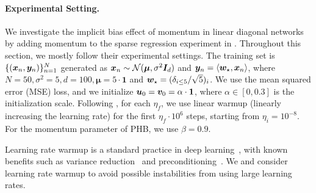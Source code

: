 \paragraph{Experimental Setting.}
We investigate the implicit bias effect of momentum in linear diagonal networks by adding momentum to the sparse regression experiment in \citet{nacson2022stepsize}.
Throughout this section, we mostly follow their experimental settings.
The training set is $\{({\bm{x}}_n, {\bm{y}}_n)\}_{n=1}^N$ generated as ${\bm{x}}_n \sim {\mathcal{N}}(\bm\mu, \sigma^2 {\bm{I}}_d)$ and ${\bm{y}}_n = \langle {\bm{w}}_\star, {\bm{x}}_n \rangle$, where $N = 50, \sigma^2 = 5, d = 100, \bm\mu = 5\cdot\bm{1}$ and ${\bm{w}}_\star = (\delta_{i \leq 5} / \sqrt{5})_i$.
We use the mean squared error (MSE) loss, and we initialize ${\bm{u}}_0 = {\bm{v}}_0 = \alpha\cdot\bm{1}$, where $\alpha \in [0, 0.3]$ is the initialization scale.
Following \cite{nacson2022stepsize}, for each $\eta_f$, we use linear warmup (linearly increasing the learning rate) for the first $\eta_f \cdot 10^6$ steps, starting from $\eta_i = 10^{-8}$.
For the momentum parameter of PHB, we use $\beta = 0.9$.

\begin{remark}
    Learning rate warmup is a standard practice in deep learning~\citep{goyal2017warmup}, with known benefits such as variance reduction~\citep{gotmare2018warmup,liu2020warmup} and preconditioning~\citep{gilmer2022stability}.
    We and \cite{nacson2022stepsize} consider learning rate warmup to avoid possible instabilities from using large learning rates.
\end{remark}


